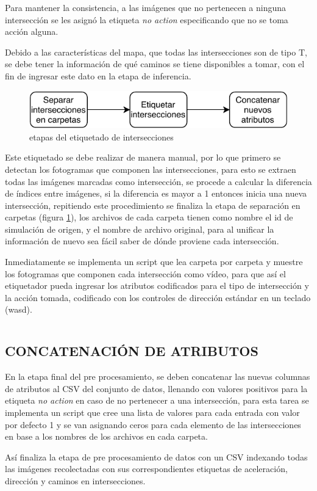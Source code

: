 		Para mantener la consistencia, a las imágenes que no pertenecen a ninguna intersección se les asignó la etiqueta \textit{no action} especificando que no se toma acción alguna.
		
		Debido a las características del mapa, que todas las intersecciones son de tipo T, se debe tener la información de qué caminos se tiene disponibles a tomar, con el fin de ingresar este dato en la etapa de inferencia.
		
		\begin{figure}[H]
			\centering
			\includegraphics[scale=1]{imagenes/arquitectura_juncs}
			\caption[Etapas del etiquetado de intersecciones]{etapas del etiquetado de intersecciones}
			\label{junctions}
		\end{figure}
		
		Este etiquetado se debe realizar de manera manual, por lo que primero se detectan los fotogramas que componen las intersecciones, para esto se extraen todas las imágenes marcadas como intersección, se procede a calcular la diferencia de índices entre imágenes, si la diferencia es mayor a 1 entonces inicia una nueva intersección, repitiendo este procedimiento se finaliza la etapa de separación en carpetas (figura \ref{junctions}), los archivos de cada carpeta tienen como nombre el id de simulación de origen, y el nombre de archivo original, para al unificar la información de nuevo sea fácil saber de dónde proviene cada intersección.
		
		Inmediatamente se implementa un script que lea carpeta por carpeta y muestre los fotogramas que componen cada intersección como vídeo, para que así el etiquetador pueda ingresar los atributos codificados para el tipo de intersección y la acción tomada, codificado con los controles de dirección estándar en un teclado (wasd).
		
		\inputminted[frame=lines,
		baselinestretch=1,
		fontsize=\footnotesize,
		autogobble]{python}{codigos/marco-aplicativo/junc_tag.py}
		
	\subsection{CONCATENACIÓN DE ATRIBUTOS}
		En la etapa final del pre procesamiento, se deben concatenar las nuevas columnas de atributos al CSV del conjunto de datos, llenando con valores positivos para la etiqueta \textit{no action} en caso de no pertenecer a una intersección, para esta tarea se implementa un script que cree una lista de valores para cada entrada con valor por defecto 1 y se van asignando ceros para cada elemento de las intersecciones en base a los nombres de los archivos en cada carpeta.
		
		Así finaliza la etapa de pre procesamiento de datos con un CSV indexando todas las imágenes recolectadas con sus correspondientes etiquetas de aceleración, dirección y caminos en intersecciones.